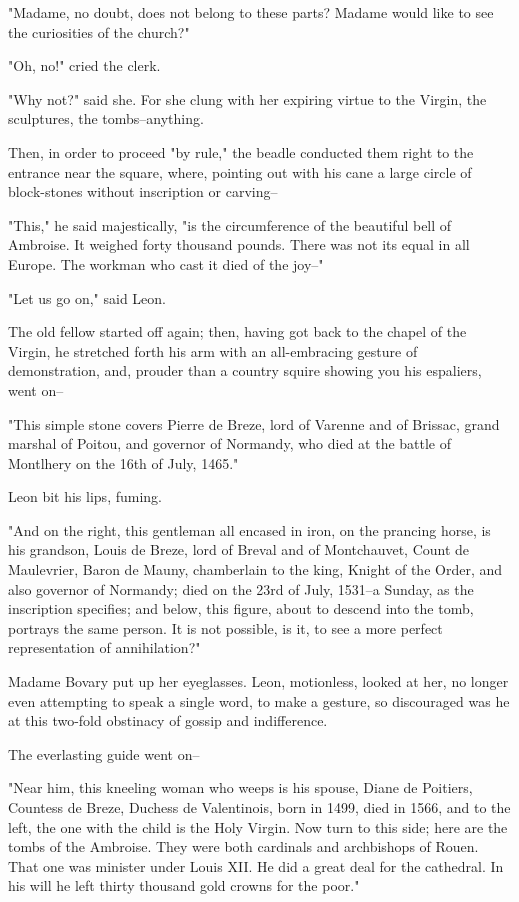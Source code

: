 \documentclass[11pt,twocolumn]{ltugboat}
\begin{document}
"Madame, no doubt, does not belong to these parts? Madame would like to
see the curiosities of the church?"

"Oh, no!" cried the clerk.

"Why not?" said she. For she clung with her expiring virtue to the
Virgin, the sculptures, the tombs--anything.

Then, in order to proceed "by rule," the beadle conducted them right to
the entrance near the square, where, pointing out with his cane a large
circle of block-stones without inscription or carving--

"This," he said majestically, "is the circumference of the beautiful
bell of Ambroise. It weighed forty thousand pounds. There was not its
equal in all Europe. The workman who cast it died of the joy--"

"Let us go on," said Leon.

The old fellow started off again; then, having got back to the chapel of
the Virgin, he stretched forth his arm with an all-embracing gesture
of demonstration, and, prouder than a country squire showing you his
espaliers, went on--

"This simple stone covers Pierre de Breze, lord of Varenne and of
Brissac, grand marshal of Poitou, and governor of Normandy, who died at
the battle of Montlhery on the 16th of July, 1465."

Leon bit his lips, fuming.

"And on the right, this gentleman all encased in iron, on the
prancing horse, is his grandson, Louis de Breze, lord of Breval and of
Montchauvet, Count de Maulevrier, Baron de Mauny, chamberlain to the
king, Knight of the Order, and also governor of Normandy; died on the
23rd of July, 1531--a Sunday, as the inscription specifies; and below,
this figure, about to descend into the tomb, portrays the same person.
It is not possible, is it, to see a more perfect representation of
annihilation?"

Madame Bovary put up her eyeglasses. Leon, motionless, looked at her,
no longer even attempting to speak a single word, to make a gesture,
so discouraged was he at this two-fold obstinacy of gossip and
indifference.

The everlasting guide went on--

"Near him, this kneeling woman who weeps is his spouse, Diane de
Poitiers, Countess de Breze, Duchess de Valentinois, born in 1499, died
in 1566, and to the left, the one with the child is the Holy Virgin. Now
turn to this side; here are the tombs of the Ambroise. They were both
cardinals and archbishops of Rouen. That one was minister under Louis
XII. He did a great deal for the cathedral. In his will he left thirty
thousand gold crowns for the poor."
\end{document}
